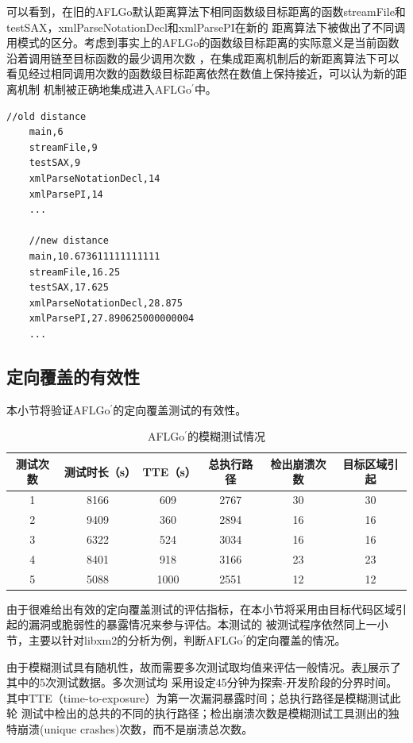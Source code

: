 \documentclass[bachelor]{njupthesis}
\begin{document}
可以看到，在旧的AFLGo默认距离算法下相同函数级目标距离的函数streamFile和testSAX，xmlParseNotationDecl和xmlParsePI在新的
距离算法下被做出了不同调用模式的区分。考虑到事实上的AFLGo的函数级目标距离的实际意义是当前函数沿着调用链至目标函数的最少调用次数
，在集成距离机制后的新距离算法下可以看见经过相同调用次数的函数级目标距离依然在数值上保持接近，可以认为新的距离机制
机制被正确地集成进入AFLGo$^\prime$中。

\renewcommand{\thelstlisting}{5.\arabic{lstlisting}}
\begin{lstlisting}[caption={先后目标距离对比},label={code:callsite},basicstyle=\linespread{0.85}\ttfamily\small]
	//old distance
	main,6
	streamFile,9
	testSAX,9
	xmlParseNotationDecl,14
	xmlParsePI,14
	...

	//new distance
	main,10.673611111111111
	streamFile,16.25
	testSAX,17.625
	xmlParseNotationDecl,28.875	
	xmlParsePI,27.890625000000004	
	...
\end{lstlisting}
\subsection{定向覆盖的有效性}
本小节将验证AFLGo$^\prime$的定向覆盖测试的有效性。

\begin{table}[htbp]
	\centering
	\begin{tabular}{|c|c|c|c|c|c|}
	  \hline
	  测试次数 & 测试时长（s）& TTE（s）&总执行路径& 检出崩溃次数 &目标区域引起 \\
	  \hline
	  1 & 8166 & 609 & 2767  &30 & 30\\
	  \hline
	  2 & 9409 & 360 & 2894  &16& 16\\
	  \hline
	  3 & 6322 & 524 & 3034  & 16& 16\\
	  \hline
	  4 & 8401 & 918 & 3166 &  23 & 23\\
	  \hline 
	  5 & 5088 & 1000 & 2551&  12 & 12\\
	  \hline  
	\end{tabular}
	\caption{AFLGo$^\prime$的模糊测试情况}\label{tab:aflgop}
\end{table}

由于很难给出有效的定向覆盖测试的评估指标，在本小节将采用由目标代码区域引起的漏洞或脆弱性的暴露情况来参与评估。本测试的
被测试程序依然同上一小节，主要以针对libxm2的分析为例，判断AFLGo$^\prime$的定向覆盖的情况。

由于模糊测试具有随机性，故而需要多次测试取均值来评估一般情况。表\ref{tab:aflgop}展示了其中的5次测试数据。多次测试均
采用设定45分钟为探索-开发阶段的分界时间。其中TTE（time-to-exposure）为第一次漏洞暴露时间；总执行路径是模糊测试此轮
测试中检出的总共的不同的执行路径；检出崩溃次数是模糊测试工具测出的独特崩溃(unique crashes)次数，而不是崩溃总次数。
\end{document}
